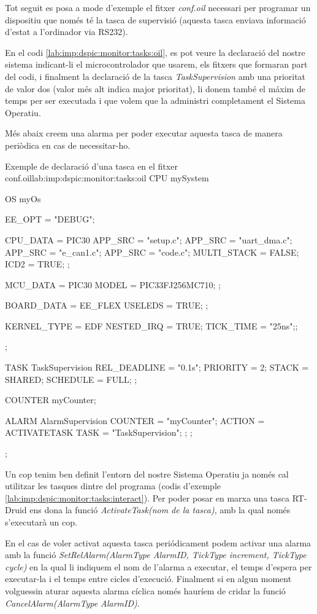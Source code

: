 Tot seguit es posa a mode d'exemple el fitxer \emph{conf.oil} necessari per programar un dispositiu que només té la tasca de supervisió (aquesta tasca enviava informació d'estat a l'ordinador via RS232).

En el codi \ref{lab:imp:dspic:monitor:tasks:oil}, es pot veure la declaració del nostre sistema indicant-li el microcontrolador que usarem, els fitxers que formaran part del codi, i finalment la declaració de la tasca \emph{TaskSupervision} amb una prioritat de valor dos (valor més alt indica major prioritat), li donem també el máxim de temps per ser executada i que volem que la administri completament el Sistema Operatiu.

Més abaix creem una alarma per poder executar aquesta tasca de manera periòdica en cas de necessitar-ho.


\begin{code_c}{Exemple de declaració d'una tasca en el fitxer conf.oil}{lab:imp:dspic:monitor:tasks:oil}
CPU mySystem {

	OS myOs {
		EE_OPT = "DEBUG";

		CPU_DATA = PIC30 {
			APP_SRC = "setup.c";
			APP_SRC = "uart_dma.c";
			APP_SRC = "e_can1.c";
			APP_SRC = "code.c";
			MULTI_STACK = FALSE;
			ICD2 = TRUE;
		};

		MCU_DATA = PIC30 {
			MODEL = PIC33FJ256MC710;
		};

		BOARD_DATA = EE_FLEX {
			USELEDS = TRUE;
		};

		
		KERNEL_TYPE = EDF { NESTED_IRQ = TRUE; TICK_TIME = "25ns";};
		
	};

	TASK TaskSupervision {
		REL_DEADLINE = "0.1s";
		PRIORITY = 2;
		STACK = SHARED;
		SCHEDULE = FULL;
	};

	COUNTER myCounter;
	
	ALARM AlarmSupervision {
		COUNTER = "myCounter";
		ACTION = ACTIVATETASK { TASK = "TaskSupervision"; };
	};
}; 
\end{code_c}

Un cop tenim ben definit l'entorn del nostre Sistema Operatiu ja només cal utilitzar les tasques dintre del programa (codis d'exemple \ref{lab:imp:dspic:monitor:tasks:interact}). Per poder posar en marxa una tasca RT-Druid ens dona la funció \emph{ActivateTask(nom de la tasca)}, amb la qual només s'executarà un cop. 

En el cas de voler activat aquesta tasca periódicament podem activar una alarma amb la funció \emph{SetRelAlarm(AlarmType AlarmID, TickType increment, TickType cycle)} en la qual li indiquem el nom de l'alarma a executar, el temps d'espera per executar-la i el temps entre cicles d'execució. Finalment si en algun moment volguessin aturar aquesta alarma cíclica només hauríem de cridar la funció \emph{CancelAlarm(AlarmType AlarmID)}.

